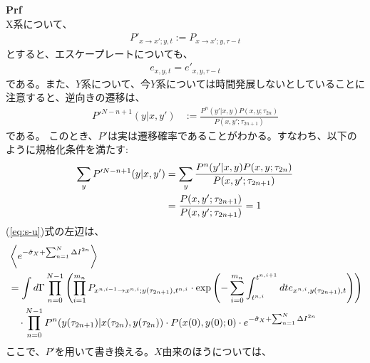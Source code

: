 \documentclass[a4paper,11pt]{jsarticle}
\numberwithin{equation}{section}
\begin{document}
\textbf{Prf}\\
X系について、
\begin{align}
    P'_{x \to x'; y, t} := P_{x\to x'; y, \tau-t}
\end{align}
とすると、エスケープレートについても、
\begin{align}
    e_{x,y,t} =e'_{x,y,\tau-t}
\end{align}
である。また、$Y$系について、今$Y$系については時間発展しないとしていることに注意すると、逆向きの遷移は、
\begin{align}
    P'^{N-n+1}(y|x, y') &:= \frac{P^n(y'|x, y) P(x, y; \tau_{2n})}{P(x, y'; \tau_{2n+1})} 
\end{align}
である。
このとき、$P'$は実は遷移確率であることがわかる。すなわち、以下のように規格化条件を満たす:
\begin{align}
    \sum_{y} P'^{N-n+1}(y|x, y') &= \sum_{y} \frac{P^n(y'|x, y) P(x, y; \tau_{2n})}{P(x, y'; \tau_{2n+1})} \notag \\
    &= \frac{P(x, y'; \tau_{2n+1})}{P(x, y'; \tau_{2n+1})} = 1 
\end{align}
(\ref{eq:s-u})式の左辺は、
\begin{align}
    &\left\langle e^{-\hat{\sigma}_X + \sum_{n=1}^N \Delta I^{2n}} \right\rangle \\
    &= \int d\Gamma \prod_{n=0}^{N-1} \left( \prod_{i=1}^{m_n} P_{x^{n,i-1} \to x^{n,i}; y(\tau_{2n+1}), t^{n,i}} \cdot \exp \left( -\sum_{i=0}^{m_n} \int_{t^{n,i}}^{t^{n,i+1}} dt e_{x^{n,i}, y(\tau_{2n+1}), t} \right) \right) \notag \\
    &\quad \cdot \prod_{n=0}^{N-1} P^n(y(\tau_{2n+1}) | x(\tau_{2n}), y(\tau_{2n})) \cdot P(x(0), y(0); 0) \cdot e^{-\hat{\sigma}_X + \sum_{n=1}^N \Delta I^{2n}} 
\end{align}
ここで、$P'$を用いて書き換える。$X$由来のほうについては、
\end{document}
